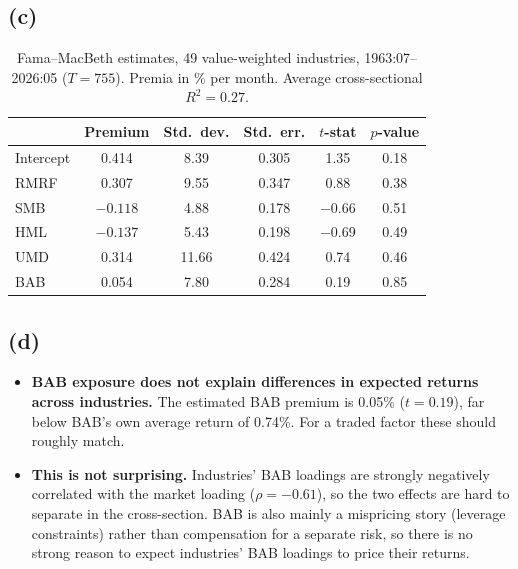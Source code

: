 \subsection*{(c)}
\begin{table}[H]
\centering
\caption{Fama--MacBeth estimates, 49 value-weighted industries, 1963:07--2026:05 ($T=755$). Premia in \% per month. Average cross-sectional $R^2=0.27$.}
\label{tab:fm_bab}
\begin{tabular}{lccccc}
\toprule
 & Premium & Std.\ dev. & Std.\ err. & $t$-stat & $p$-value \\
\midrule
Intercept & 0.414 & 8.39 & 0.305 & 1.35 & 0.18 \\
RMRF      & 0.307 & 9.55 & 0.347 & 0.88 & 0.38 \\
SMB       & $-0.118$ & 4.88 & 0.178 & $-0.66$ & 0.51 \\
HML       & $-0.137$ & 5.43 & 0.198 & $-0.69$ & 0.49 \\
UMD       & 0.314 & 11.66 & 0.424 & 0.74 & 0.46 \\
BAB       & 0.054 & 7.80 & 0.284 & 0.19 & 0.85 \\
\bottomrule
\end{tabular}
\end{table}

\subsection*{(d)}
\begin{itemize}
  \item \textbf{BAB exposure does not explain differences in expected returns across industries.} The estimated BAB premium is 0.05\% ($t=0.19$), far below BAB's own average return of 0.74\%. For a traded factor these should roughly match.
  \item \textbf{This is not surprising.} Industries' BAB loadings are strongly negatively correlated with the market loading ($\rho=-0.61$), so the two effects are hard to separate in the cross-section. BAB is also mainly a mispricing story (leverage constraints) rather than compensation for a separate risk, so there is no strong reason to expect industries' BAB loadings to price their returns.
\end{itemize}

